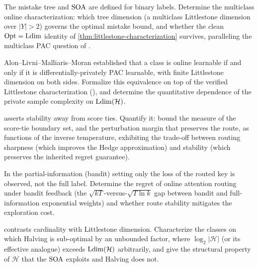 \begin{openprob}
\label{op:online-multiclass}
The mistake tree and $\mathrm{SOA}$ are defined for binary labels.  Determine the multiclass online characterization: which tree dimension (a multiclass Littlestone dimension over $|Y| > 2$) governs the optimal mistake bound, and whether the clean $\mathrm{Opt} = \mathrm{Ldim}$ identity of \cref{thm:littlestone-characterization} survives, paralleling the multiclass PAC question of .
\end{openprob}

\begin{openprob}
\label{op:private-online}
Alon--Livni--Malliaris--Moran established that a class is online learnable if and only if it is differentially-privately PAC learnable, with finite Littlestone dimension on both sides.  Formalize this equivalence on top of the verified Littlestone characterization (), and determine the quantitative dependence of the private sample complexity on $\mathrm{Ldim}(\mathcal{H})$.
\end{openprob}

\begin{openprob}
\label{op:route-stability-quant}
 asserts stability away from score ties.  Quantify it: bound the measure of the score-tie boundary set, and the perturbation margin that preserves the route, as functions of the inverse temperature, exhibiting the trade-off between routing sharpness (which improves the Hedge approximation) and stability (which preserves the inherited regret guarantee).
\end{openprob}

\begin{openprob}
\label{op:bandit-attention}
In the partial-information (bandit) setting only the loss of the routed key is observed, not the full label.  Determine the regret of online attention routing under bandit feedback (the $\sqrt{kT}$-versus-$\sqrt{T\ln k}$ gap between bandit and full-information exponential weights) and whether route stability mitigates the exploration cost.
\end{openprob}

\begin{openprob}
\label{op:halving-soa}
 contrasts cardinality with Littlestone dimension.  Characterize the classes on which Halving is sub-optimal by an unbounded factor, where $\log_2|\mathcal{H}|$ (or its effective analogue) exceeds $\mathrm{Ldim}(\mathcal{H})$ arbitrarily, and give the structural property of $\mathcal{H}$ that the $\mathrm{SOA}$ exploits and Halving does not.
\end{openprob}

